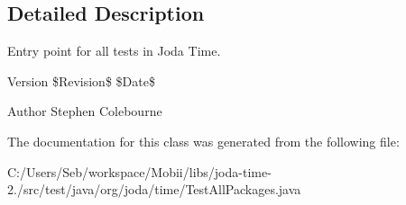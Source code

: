 \subsection{Detailed Description}
Entry point for all tests in Joda Time.

\begin{DoxyVersion}{Version}
\$\-Revision\$ \$\-Date\$
\end{DoxyVersion}
\begin{DoxyAuthor}{Author}
Stephen Colebourne 
\end{DoxyAuthor}


The documentation for this class was generated from the following file\-:\begin{DoxyCompactItemize}
\item 
C\-:/\-Users/\-Seb/workspace/\-Mobii/libs/joda-\/time-\/2./src/test/java/org/joda/time/Test\-All\-Packages.\-java\end{DoxyCompactItemize}
